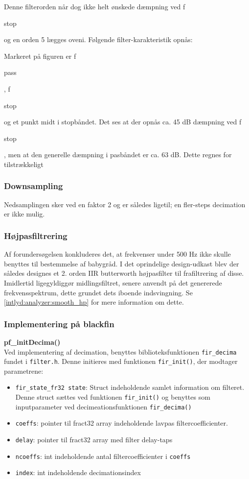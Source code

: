 Denne filterorden når dog ikke helt ønskede dæmpning ved f\begin{tiny}stop\end{tiny} og en orden 5 lægges oveni. Følgende filter-karakteristik opnås:

Markeret på figuren er f\begin{tiny}pass\end{tiny}, f\begin{tiny}stop\end{tiny} og et punkt midt i stopbåndet. Det ses at der opnås ca. 45 dB dæmpning ved f\begin{tiny}stop\end{tiny}, men at den generelle dæmpning i pasbåndet er ca. 63 dB. Dette regnes for tilstrækkeligt

\subsubsection*{Downsampling} 
Nedsamplingen sker ved en faktor 2 og er således ligetil; en fler-steps decimation er ikke mulig.

\subsubsection{Højpasfiltrering}
Af forundersøgelsen konkluderes det, at frekvenser under 500 Hz ikke skulle benyttes til bestemmelse af babygråd. I det oprindelige design-udkast blev der således designes et 2. orden IIR butterworth højpasfilter til frafiltrering af disse. Imidlertid ligegyldiggør midlingsfiltret, senere anvendt på det genererede frekvensspektrum, dette grundet dets iboende indsvingning. Se \ref{intlyd:analyzer:smooth_hp} for mere information om dette.

\subsubsection{Implementering på blackfin}
\textbf{pf\_initDecima()} \\
Ved implementering af decimation, benyttes biblioteksfunktionen \verb+fir_decima+ fundet i \verb+filter.h+. Denne initieres med funktionen \verb+fir_init()+, der modtager parametrene:
\begin{itemize}
	\item \verb+fir_state_fr32 state+: Struct indeholdende samlet information om filteret. Denne struct sættes ved funktionen \verb+fir_init()+ og benyttes som inputparameter ved decimeationsfunktionen \verb+fir_decima()+
	\item \verb+coeffs+: pointer til fract32 array indeholdende lavpas filtercoefficienter. 
	\item \verb+delay+: pointer til fract32 array med filter delay-taps
	\item \verb+ncoeffs+: int indeholdende antal filtercoefficienter i \verb+coeffs+
	\item \verb+index+: int indeholdende decimationsindex
\end{itemize}

